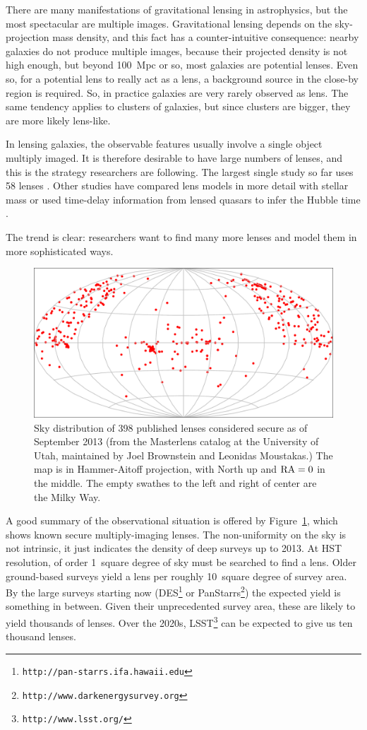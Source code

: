 \documentclass[12pt,preprint]{aastex}
\begin{document}
There are many manifestations of gravitational lensing in astrophysics,
but the most spectacular are multiple images.  Gravitational lensing
depends on the sky-projection mass density, and this fact has a
counter-intuitive consequence: nearby galaxies do not produce multiple
images, because their projected density is not high enough, but beyond
100~Mpc or so, most galaxies are potential lenses.  Even so, for a
potential lens to really act as a lens, a background source in the close-by
region is required.  So, in practice galaxies are very rarely observed
as lens.  The same tendency applies to clusters of galaxies, but since
clusters are bigger, they are more likely lens-like.

In lensing galaxies, the observable features usually involve a single
object multiply imaged.  It is therefore desirable to have large
numbers of lenses, and this is the strategy researchers are following.  The
largest single study so far uses 58 lenses \citep{2009ApJ...703L..51K}.
Other studies have compared lens models in more detail with stellar
mass \citep{2011ApJ...740...97L} or used time-delay information from
lensed quasars to infer the Hubble time
\citep{2008ApJ...679...17C,2010ApJ...712.1378P}.

The trend is clear: researchers want to find many more lenses and
model them in more sophisticated ways.

\begin{figure}[h]
\centering
\includegraphics[width=.7\hsize]{fig/lenssky}
\caption{Sky distribution of 398 published lenses considered secure as
  of September 2013 (from the Masterlens catalog at the University of
  Utah, maintained by Joel Brownstein and Leonidas Moustakas.) The map
  is in Hammer-Aitoff projection, with North up and $\rm RA=0$ in the
  middle.  The empty swathes to the left and right of center are the
  Milky Way.}
\label{fig:masterlens}
\end{figure}

A good summary of the observational situation is offered by
Figure~\ref{fig:masterlens}, which shows known secure multiply-imaging
lenses.  The non-uniformity on the sky is not intrinsic, it just
indicates the density of deep surveys up to 2013.  At HST resolution,
of order 1~square degree of sky must be searched to find a lens.
Older ground-based surveys yield a lens per roughly 10~square degree
of survey area.  By the large surveys starting now
(DES\footnote{\tt http://pan-starrs.ifa.hawaii.edu} or
PanStarrs\footnote{\tt http://www.darkenergysurvey.org}) the expected
yield is something in between.  Given their unprecedented survey area,
these are likely to yield thousands of lenses.  Over the 2020s,
LSST\footnote{\tt http://www.lsst.org/} can be expected to give us ten
thousand lenses.
\end{document}

